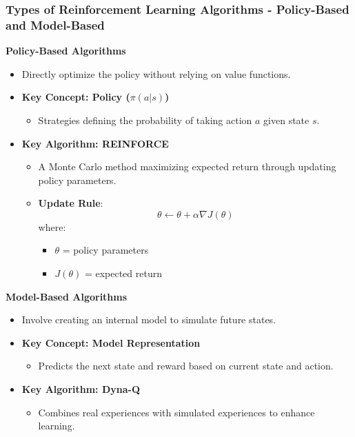 \documentclass[aspectratio=169]{beamer}
\begin{document}
\begin{frame}[fragile]
    \frametitle{Types of Reinforcement Learning Algorithms - Policy-Based and Model-Based}
    \textbf{Policy-Based Algorithms}
    \begin{itemize}
        \item Directly optimize the policy without relying on value functions.
        \item \textbf{Key Concept: Policy ($\pi(a|s)$)}
        \begin{itemize}
            \item Strategies defining the probability of taking action $a$ given state $s$.
        \end{itemize}
        \item \textbf{Key Algorithm: REINFORCE}
        \begin{itemize}
            \item A Monte Carlo method maximizing expected return through updating policy parameters.
            \item \textbf{Update Rule}:
            \begin{equation}
                \theta \leftarrow \theta + \alpha \nabla J(\theta)
            \end{equation}
            where:
            \begin{itemize}
                \item $\theta$ = policy parameters
                \item $J(\theta)$ = expected return
            \end{itemize}
        \end{itemize}
    \end{itemize}

    \textbf{Model-Based Algorithms}
    \begin{itemize}
        \item Involve creating an internal model to simulate future states.
        \item \textbf{Key Concept: Model Representation}
        \begin{itemize}
            \item Predicts the next state and reward based on current state and action.
        \end{itemize}
        \item \textbf{Key Algorithm: Dyna-Q}
        \begin{itemize}
            \item Combines real experiences with simulated experiences to enhance learning.
        \end{itemize}
    \end{itemize}
\end{frame}
\end{document}
